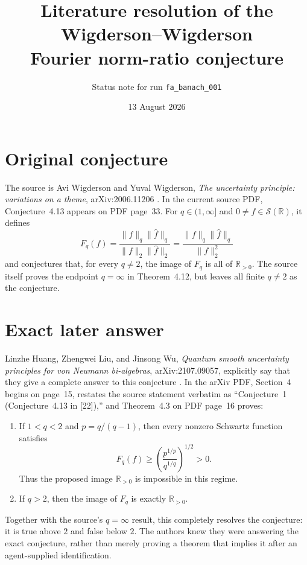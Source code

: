 \documentclass[11pt]{article}
\title{Literature resolution of the Wigderson--Wigderson\\Fourier norm-ratio conjecture}
\author{Status note for run \texttt{fa\_banach\_001}}
\date{13 August 2026}
\newcommand{\R}{\mathbb R}
\newcommand{\Sclass}{\mathcal S}
\begin{document}
\maketitle

\begin{center}
\end{center}

\section*{Original conjecture}

The source is Avi Wigderson and Yuval Wigderson, \emph{The uncertainty
principle: variations on a theme}, arXiv:2006.11206 \cite{WW}.  In the current
source PDF, Conjecture~4.13 appears on PDF page~33.  For $q\in(1,\infty]$ and
$0\neq f\in\Sclass(\R)$, it defines
\[
 F_q(f)=\frac{\|f\|_q\|\widehat f\|_q}
              {\|f\|_2\|\widehat f\|_2}
       =\frac{\|f\|_q\|\widehat f\|_q}{\|f\|_2^2}
\]
and conjectures that, for every $q\neq2$, the image of $F_q$ is all of
$\R_{>0}$.  The source itself proves the endpoint $q=\infty$ in
Theorem~4.12, but leaves all finite $q\neq2$ as the conjecture.

\section*{Exact later answer}

Linzhe Huang, Zhengwei Liu, and Jinsong Wu, \emph{Quantum smooth uncertainty
principles for von Neumann bi-algebras}, arXiv:2107.09057, explicitly say that
they give a complete answer to this conjecture \cite{HLW}.  In the arXiv PDF,
Section~4 begins on page~15, restates the source statement verbatim as
``Conjecture~1 (Conjecture~4.13 in [22]),'' and Theorem~4.3 on PDF page~16
proves:
\begin{enumerate}
\item If $1<q<2$ and $p=q/(q-1)$, then every nonzero Schwartz function
satisfies
\[
 F_q(f)\geq\left(\frac{p^{1/p}}{q^{1/q}}\right)^{1/2}>0.
\]
Thus the proposed image $\R_{>0}$ is impossible in this regime.
\item If $q>2$, then the image of $F_q$ is exactly $\R_{>0}$.
\end{enumerate}
Together with the source's $q=\infty$ result, this completely resolves the
conjecture: it is true above $2$ and false below $2$.  The authors knew they
were answering the exact conjecture, rather than merely proving a theorem
that implies it after an agent-supplied identification.
\end{document}
